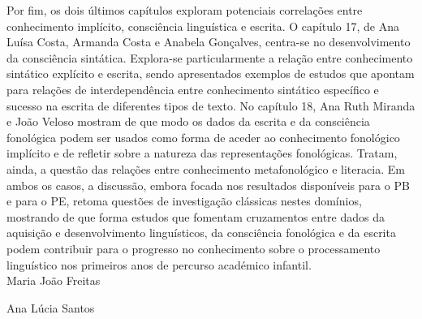 Por fim, os dois últimos capítulos exploram potenciais correlações entre conhecimento implícito, consciência linguística e escrita. O capítulo 17, de Ana Luísa Costa, Armanda Costa e Anabela Gonçalves, centra-se no desenvolvimento da consciência sintática. Explora-se particularmente a relação entre conhecimento sintático explícito e escrita, sendo apresentados exemplos de estudos que apontam para relações de interdependência entre conhecimento sintático específico e sucesso na escrita de diferentes tipos de texto. No capítulo 18, Ana Ruth Miranda e João Veloso mostram de que modo os dados da escrita e da consciência fonológica podem ser usados como forma de aceder ao conhecimento fonológico implícito e de refletir sobre a natureza das representações fonológicas. Tratam, ainda, a questão das relações entre conhecimento metafonológico e literacia. Em ambos os casos, a discussão, embora focada nos resultados disponíveis para o PB e para o PE, retoma questões de investigação clássicas nestes domínios, mostrando de que forma estudos que fomentam cruzamentos entre dados da aquisição e desenvolvimento linguísticos, da consciência fonológica e da escrita podem contribuir para o progresso no conhecimento sobre o processamento linguístico nos primeiros anos de percurso académico infantil.\\

\hfill Maria João Freitas

\hfill Ana Lúcia Santos




% 
